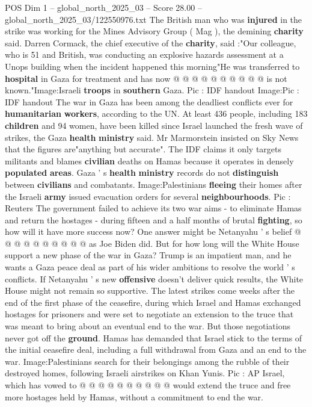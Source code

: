 \begin{textsample}{POS Dim 1 – global\_north\_2025\_03 – Score 28.00 – global\_north\_2025\_03/122550976.txt}
The British man who was \textbf{injured} in the strike was working for the Mines Advisory Group ( Mag ), the demining \textbf{charity} said.
Darren Cormack, the chief executive of the \textbf{charity}, said :"Our colleague, who is 51 and British, was conducting an explosive hazards assessment at a Unops building when the incident happened this morning"He was transferred to \textbf{hospital} in Gaza for treatment and has now @ @ @ @ @ @ @ @ @ @ is not known."Image:Israeli \textbf{troops} in \textbf{southern} Gaza.
Pic : IDF handout Image:Pic : IDF handout The war in Gaza has been among the deadliest conflicts ever for \textbf{humanitarian} \textbf{workers}, according to the UN.
At least 436 people, including 183 \textbf{children} and 94 women, have been killed since Israel launched the fresh wave of strikes, the Gaza \textbf{health} \textbf{ministry} said.
Mr Marmorstein insisted on Sky News that the figures are"anything but accurate".
The IDF claims it only targets militants and blames \textbf{civilian} deaths on Hamas because it operates in densely \textbf{populated} \textbf{areas}.
Gaza ' s \textbf{health} \textbf{ministry} records do not \textbf{distinguish} between \textbf{civilians} and combatants.
Image:Palestinians \textbf{fleeing} their homes after the Israeli \textbf{army} issued evacuation orders for several \textbf{neighbourhoods}.
Pic : Reuters The government failed to achieve its two war aims - to eliminate Hamas and return the hostages - during fifteen and a half months of brutal \textbf{fighting}, so how will it have more success now?
One answer might be Netanyahu ' s belief @ @ @ @ @ @ @ @ @ @ as Joe Biden did.
But for how long will the White House support a new phase of the war in Gaza?
Trump is an impatient man, and he wants a Gaza peace deal as part of his wider ambitions to resolve the world ' s conflicts.
If Netanyahu ' s new \textbf{offensive} doesn't deliver quick results, the White House might not remain so supportive.
The latest strikes come weeks after the end of the first phase of the ceasefire, during which Israel and Hamas exchanged hostages for prisoners and were set to negotiate an extension to the truce that was meant to bring about an eventual end to the war.
But those negotiations never got off the \textbf{ground}.
Hamas has demanded that Israel stick to the terms of the initial ceasefire deal, including a full withdrawal from Gaza and an end to the war.
Image:Palestinians search for their belongings among the rubble of their destroyed homes, following Israeli airstrikes on Khan Yunis.
Pic : AP Israel, which has vowed to @ @ @ @ @ @ @ @ @ @ would extend the truce and free more hostages held by Hamas, without a commitment to end the war.

\end{textsample}
